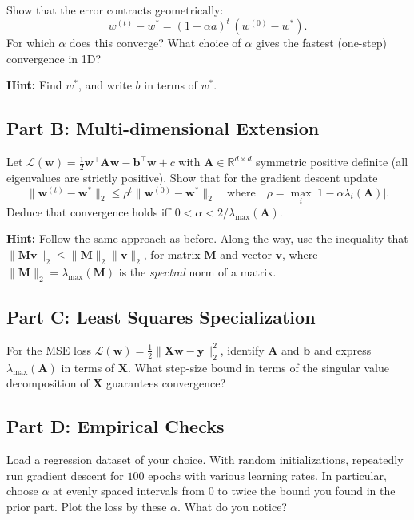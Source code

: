 \documentclass{article}
\begin{document}
Show that the error contracts geometrically:
\[
w^{(t)} - w^* = (1 - \alpha a)^t \,(w^{(0)} - w^*).
\]
For which $\alpha$ does this converge? What choice of $\alpha$ gives the fastest (one-step) convergence in 1D?

\textbf{Hint:} Find $w^*$, and write $b$ in terms of $w^*$.

\subsection*{Part B: Multi-dimensional Extension}
Let $\mathcal{L}(\mathbf{w}) = \tfrac12 \mathbf{w}^\top \mathbf{A} \mathbf{w} - \mathbf{b}^\top \mathbf{w} + c$ with $\mathbf{A} \in \mathbb{R}^{d\times d}$ symmetric positive definite (all eigenvalues are strictly positive).
Show that for the gradient descent update 
$$
\|\mathbf{w}^{(t)}-\mathbf{w}^*\|_2 \le \rho^t \|\mathbf{w}^{(0)}-\mathbf{w}^*\|_2
\quad\text{where}\quad
\rho = \max_i |1-\alpha \lambda_i(\mathbf{A})|.
$$
Deduce that convergence holds iff $0<\alpha<2/\lambda_{\max}(\mathbf{A})$.

\textbf{Hint:} Follow the same approach as before. Along the way, use the inequality that $\| \mathbf{M v} \|_2 \leq \| \mathbf{M} \|_2 \|\mathbf{v}\|_2$, for matrix $\mathbf{M}$ and vector $\mathbf{v}$, where $\| \mathbf{M} \|_2 = \lambda_{\text{max}} (\mathbf{M})$ is the \textit{spectral} norm of a matrix.

\subsection*{Part C: Least Squares Specialization}
For the MSE loss $\mathcal{L}(\mathbf{w})=\tfrac1{2}\|\mathbf{X}\mathbf{w}-\mathbf{y}\|_2^2$, identify $\mathbf{A}$ and $\mathbf{b}$ and express $\lambda_{\max}(\mathbf{A})$ in terms of $\mathbf{X}$. What step-size bound in terms of the singular value decomposition of $\mathbf{X}$ guarantees convergence?

\subsection*{Part D: Empirical Checks}

Load a regression dataset of your choice.
With random initializations, repeatedly run gradient descent for $100$ epochs with various learning rates.
In particular, choose $\alpha$ at evenly spaced intervals from $0$ to twice the bound you found in the prior part.
Plot the loss by these $\alpha$.
What do you notice?
\end{document}
